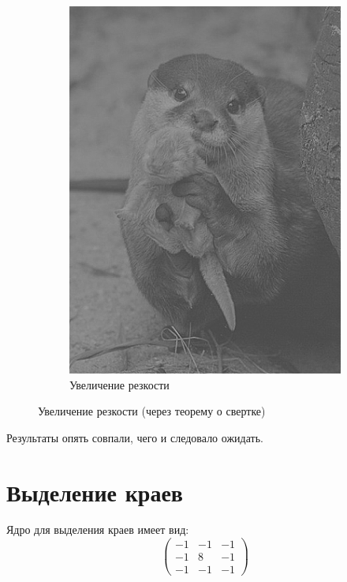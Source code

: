 \begin{figure}[ht!]
\begin{subfigure}[b]{0.5\linewidth}
        \includegraphics[width=0.95\linewidth]{laplacian.png}
        \caption{Увеличение резкости}
    \end{subfigure}
    \caption{Увеличение резкости (через теорему о свертке)}
    \label{img:sharp2}
\end{figure}

Результаты опять совпали, чего и следовало ожидать.

\FloatBarrier
\section{Выделение краев}

Ядро для выделения краев имеет вид:
\begin{equation}
    \begin{pmatrix}
        -1 & -1 & -1 \\
        -1 & 8 & -1 \\
        -1 & -1 & -1
    \end{pmatrix}
\end{equation}

